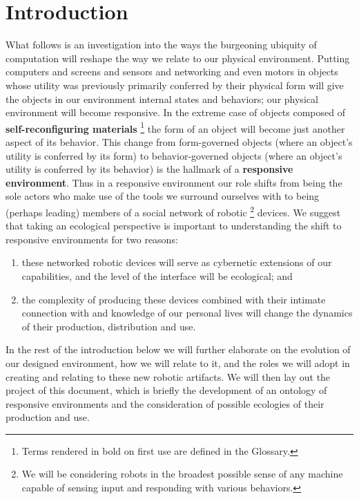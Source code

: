 \section{Introduction}
%
What follows is an investigation into the ways the burgeoning ubiquity of computation will reshape the way we relate to our physical environment.
Putting computers and screens and sensors and networking and even motors in objects whose utility was previously primarily conferred by their physical form will give the objects in our environment internal states and behaviors; our physical environment will become responsive.
In the extreme case of objects composed of {\bf self-reconfiguring materials}%
\footnote{Terms rendered in bold on first use are defined in the Glossary.}
the form of an object will become just another aspect of its behavior.
This change from form-governed objects (where an object's utility is conferred by its form) to behavior-governed objects (where an object's utility is conferred by its behavior) is the hallmark of a {\bf responsive environment}.
Thus in a responsive environment our role shifts from being the sole actors who make use of the tools we surround ourselves with to being (perhaps leading) members of a social network of robotic%
\footnote{We will be considering robots in the broadest possible sense of any machine capable of sensing input and responding with various behaviors.}
devices.
We suggest that taking an ecological perspective is important to understanding the shift to responsive environments for two reasons:
\begin{enumerate}
\item these networked robotic devices will serve as cybernetic extensions of our capabilities, and the level of the interface will be ecological; and
\item the complexity of producing these devices combined with their intimate connection with and knowledge of our personal lives will change the dynamics of their production, distribution and use.
\end{enumerate}

In the rest of the introduction below we will further elaborate on the evolution of our designed environment, how we will relate to it, and the roles we will adopt in creating and relating to these new robotic artifacts. We will then lay out the project of this document, which is briefly the development of an ontology of responsive environments and the consideration of possible ecologies of their production and use.

